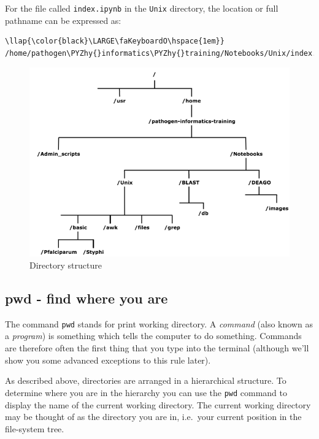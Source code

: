 \documentclass[11pt]{article}
\makeatletter
\def\maxwidth{\ifdim\Gin@nat@width>\linewidth\linewidth
    \else\Gin@nat@width\fi}
\let\Oldincludegraphics\includegraphics
\renewcommand{\includegraphics}[1]{\Oldincludegraphics[width=.8\maxwidth, height=.55\textheight, keepaspectratio]{#1}}
\def\PYZhy{\char`\-}
\makeatother
\begin{document}
For the file called \texttt{index.ipynb} in the \texttt{Unix} directory,
the location or full pathname can be expressed as:

\begin{terminalinput}
\begin{Verbatim}[commandchars=\\\{\}]
\llap{\color{black}\LARGE\faKeyboardO\hspace{1em}} /home/pathogen\PYZhy{}informatics\PYZhy{}training/Notebooks/Unix/index.ipynb
\end{Verbatim}
\end{terminalinput}

    \begin{figure}[!h]
\centering
\includegraphics{basic/directory_structure.png}
\caption{Directory structure}
\end{figure}

    \hypertarget{pwd---find-where-you-are}{%
\subsection{pwd - find where you are}\label{pwd---find-where-you-are}}

The command \texttt{pwd} stands for print working directory. A
\textit{command} (also known as a \textit{program}) is something which tells
the computer to do something. Commands are therefore often the first
thing that you type into the terminal (although we'll show you some
advanced exceptions to this rule later).

As described above, directories are arranged in a hierarchical
structure. To determine where you are in the hierarchy you can use the
\texttt{pwd} command to display the name of the current working
directory. The current working directory may be thought of as the
directory you are in, i.e.~your current position in the file-system
tree.
\end{document}
